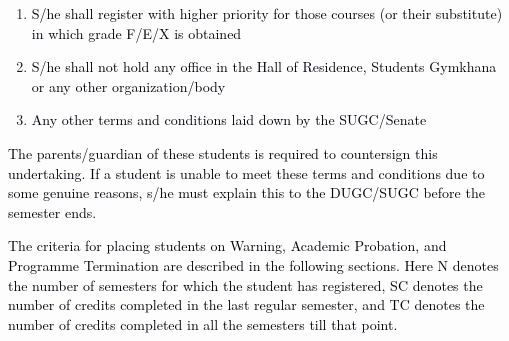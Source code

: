 \documentclass[12pt]{article}
\begin{document}
\vspace{\baselineskip}
\begin{enumerate}
	\item {\fontsize{10pt}{12.0pt}\selectfont \textcolor[HTML]{00000A}{S/he shall register with higher priority for those courses (or their substitute) in which grade F/E/X is obtained}\par}\par


\vspace{\baselineskip}
	\item {\fontsize{10pt}{12.0pt}\selectfont \textcolor[HTML]{00000A}{S/he shall not hold any office in the Hall of Residence, Students Gymkhana or any other organization/body}\par}\par


\vspace{\baselineskip}
	\item {\fontsize{10pt}{12.0pt}\selectfont \textcolor[HTML]{00000A}{Any other terms and conditions laid down by the SUGC/Senate}\par}
\end{enumerate}\par


\vspace{\baselineskip}
\begin{adjustwidth}{0.07in}{0.0in}
\begin{justify}
{\fontsize{9pt}{10.8pt}\selectfont \textcolor[HTML]{00000A}{The parents/guardian of these students is required to countersign this undertaking. If a student is unable to meet these terms and conditions due to some genuine reasons, s/he must explain this to the DUGC/SUGC before the semester ends.}\par}
\end{justify}\par

\end{adjustwidth}


\vspace{\baselineskip}
\begin{adjustwidth}{0.07in}{0.0in}
\begin{justify}
{\fontsize{9pt}{10.8pt}\selectfont \textcolor[HTML]{00000A}{The criteria for placing students on Warning, Academic Probation, and Programme Termination are described in the following sections. Here N denotes the number of semesters for which the student has registered, SC denotes the number of credits completed in the last regular semester, and TC denotes the number of credits completed in all the semesters till that point.}\par}
\end{justify}\par

\end{adjustwidth}
\end{document}
